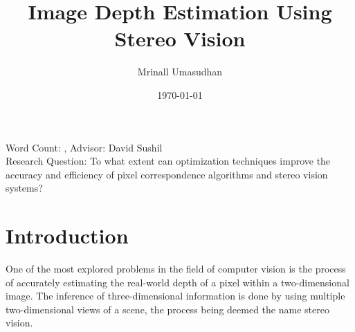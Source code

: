 \documentclass[11pt]{scrartcl}
\begin{document}
\title{Image Depth Estimation Using Stereo Vision}
\author{Mrinall Umasudhan}
\date{\today}
\maketitle
{}

\noindent Word Count: ,
Advisor: David Sushil \\ 
Research Question: To what extent can optimization techniques improve the accuracy and 
efficiency of pixel correspondence algorithms and stereo vision systems?
 
\tableofcontents




\section{Introduction}
One of the most explored problems in the field of computer vision is the process
of accurately estimating the real-world depth of a pixel within a two-dimensional
image. The inference of three-dimensional information is done by using multiple two-dimensional views of a scene, the process being deemed the name stereo vision.
\end{document}
